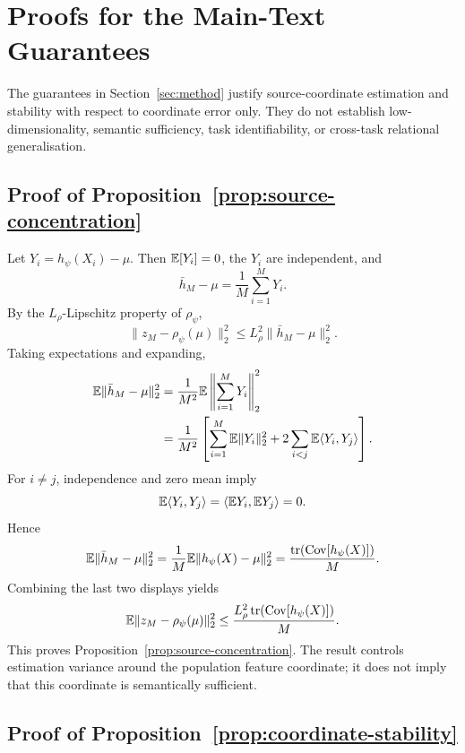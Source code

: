 \section{Proofs for the Main-Text Guarantees}
\label{app:theory}

The guarantees in Section~\ref{sec:method} justify source-coordinate estimation and stability with respect to coordinate error only. They do not establish low-dimensionality, semantic sufficiency, task identifiability, or cross-task relational generalisation.

\subsection{Proof of Proposition~\ref{prop:source-concentration}}

Let $Y_i=h_\psi(X_i)-\mu$. Then $\mathbb{E}[Y_i]=0$, the $Y_i$ are independent, and
\[
\bar h_M-\mu=\frac{1}{M}\sum_{i=1}^{M}Y_i.
\]
By the $L_\rho$-Lipschitz property of $\rho_\psi$,
\[
\|z_M-\rho_\psi(\mu)\|_2^2
\leq
L_\rho^2\|\bar h_M-\mu\|_2^2.
\]
Taking expectations and expanding,
\begin{align*}
\mathbb{E}\|\bar h_M-\mu\|_2^2
&=
\frac{1}{M^2}
\mathbb{E}\left\|\sum_{i=1}^{M}Y_i\right\|_2^2\\
&=
\frac{1}{M^2}
\left[
\sum_{i=1}^{M}\mathbb{E}\|Y_i\|_2^2
+
2\sum_{i<j}\mathbb{E}\langle Y_i,Y_j\rangle
\right].
\end{align*}
For $i\neq j$, independence and zero mean imply
\[
\mathbb{E}\langle Y_i,Y_j\rangle
=
\langle \mathbb{E} Y_i,\mathbb{E} Y_j\rangle=0.
\]
Hence
\[
\mathbb{E}\|\bar h_M-\mu\|_2^2
=
\frac{1}{M}\mathbb{E}\|h_\psi(X)-\mu\|_2^2
=
\frac{\mathrm{tr}(\mathrm{Cov}[h_\psi(X)])}{M}.
\]
Combining the last two displays yields
\[
\mathbb{E}\|z_M-\rho_\psi(\mu)\|_2^2
\leq
\frac{L_\rho^2\,\mathrm{tr}(\mathrm{Cov}[h_\psi(X)])}{M}.
\]
This proves Proposition~\ref{prop:source-concentration}. The result controls estimation variance around the population feature coordinate; it does not imply that this coordinate is semantically sufficient.

\subsection{Proof of Proposition~\ref{prop:coordinate-stability}}

